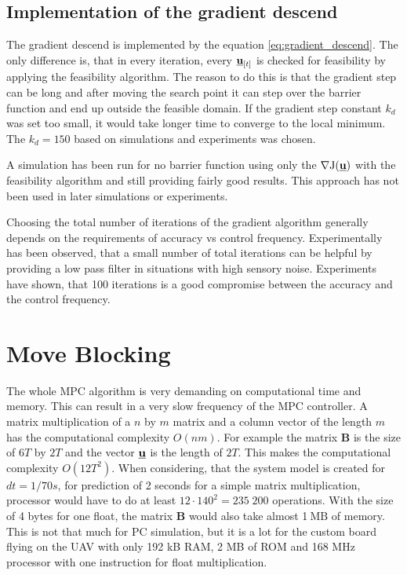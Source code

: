 \documentclass[a4paper,11pt,titlepage]{article}
\newcommand{\uvec}{\textbf{\underline{u}}}
\newcommand{\macJ}{\mathrm{J}(\uvec)}
\newcommand{\jed}[1]{\ensuremath{~\mathrm{#1}}}
\begin{document}
\subsection{Implementation of the gradient descend}
\label{sec:implementation_of_the_gradient_descend}
The gradient descend is implemented by the equation \ref{eq:gradient_descend}. The only difference is, that in every iteration, every $\uvec_{[t]}$ is checked for feasibility by applying the feasibility algorithm. The reason to do this is that the gradient step can be long and after moving the search point it can step over the barrier function and end up outside the feasible domain. If the gradient step constant $k_d$ was set too small, it would take longer time to converge to the local minimum. The $k_d = 150$ based on simulations and experiments was chosen.

A simulation has been run for no barrier function using only the $\nabla \macJ$ with the feasibility algorithm and still providing fairly good results. This approach has not been used in later simulations or experiments.

Choosing the total number of iterations of the gradient algorithm generally depends on the requirements of accuracy vs control frequency. Experimentally has been observed, that a small number of total iterations can be helpful by providing a low pass filter in situations with high sensory noise. Experiments have shown, that 100 iterations is a good compromise between the accuracy and the control frequency.

\section{Move Blocking}

The whole MPC algorithm is very demanding on computational time and memory. This can result in a very slow frequency of the MPC controller. A matrix multiplication of a $n$ by $m$ matrix and a column vector of the length $m$ has the computational complexity $O(nm)$. For example the matrix $\textbf{\^B}$ is the size of $6T$ by $2T$ and the vector $\uvec$ is the length of $2T$. This makes the computational complexity $O(12T^2)$. When considering, that the system model is created for $dt = 1/70s$, for prediction of 2 seconds for a simple matrix multiplication, processor would have to do at least $12 \cdot  140^2 = 235\;200$ operations. With the size of 4 bytes for one float, the matrix $\textbf{\^B}$ would also take almost 1\jed{MB} of memory. This is not that much for PC simulation, but it is a lot for the custom board flying on the UAV with only 192 kB RAM, 2 MB of ROM and 168 MHz processor with one instruction for float multiplication. 
\end{document}
